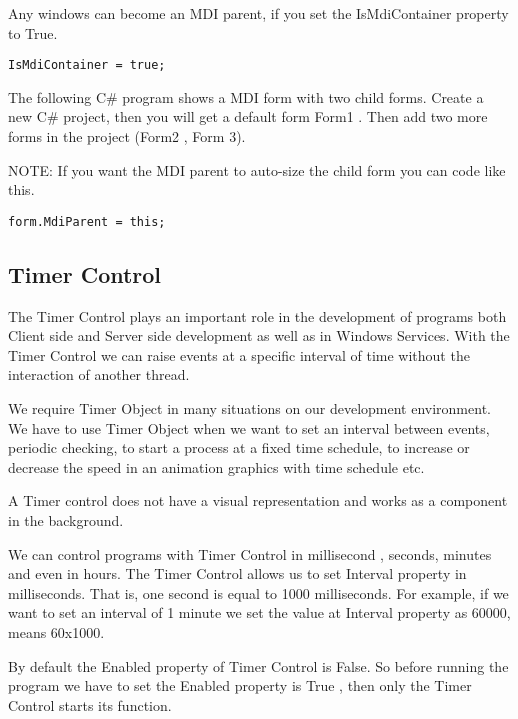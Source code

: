 Any windows can become an MDI parent, if you set the IsMdiContainer property to True.

\begin{lstlisting}[numbers=none]
IsMdiContainer = true;
\end{lstlisting}

The following C\# program shows a MDI form with two child forms. Create a new C\# project, then you will get a default form Form1 . Then add two more forms in the project (Form2 , Form 3). 

NOTE: If you want the MDI parent to auto-size the child form you can code like this.

\begin{lstlisting}[numbers=none]
form.MdiParent = this;
\end{lstlisting}



\subsection{Timer Control}
The Timer Control plays an important role in the development of programs both Client side and Server side development as well as in Windows Services. With the Timer Control we can raise events at a specific interval of time without the interaction of another thread.

We require Timer Object in many situations on our development environment. We have to use Timer Object when we want to set an interval between events, periodic checking, to start a process at a fixed time schedule, to increase or decrease the speed in an animation graphics with time schedule etc.

A Timer control does not have a visual representation and works as a component in the background.

We can control programs with Timer Control in millisecond , seconds, minutes and even in hours. The Timer Control allows us to set Interval property in milliseconds. That is, one second is equal to 1000 milliseconds. For example, if we want to set an interval of 1 minute we set the value at Interval property as 60000, means 60x1000.

By default the Enabled property of Timer Control is False. So before running the program we have to set the Enabled property is True , then only the Timer Control starts its function.

